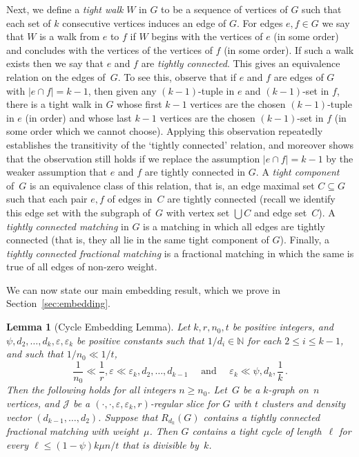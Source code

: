 \documentclass[12pt,a4paper]{amsart}
\let\subset\subseteq
\let\eps\varepsilon
\newtheorem{lemma}[theorem] {Lemma}
\newcommand{\NATS}{\mathbb{N}}
\newcommand{\cJ}{\mathcal{J}}
\begin{document}
  Next, we define a \emph{tight walk} $W$ in $G$ to be a sequence of vertices of $G$ such that each set of $k$ consecutive vertices induces an edge of $G$.
For edges $e, f \in G$ we say that $W$ is a walk from $e$ to $f$ if $W$ begins with 
the vertices of $e$ (in some order) and concludes with the vertices of  
the vertices of $f$ (in some order). If such a walk exists then we say that $e$ and $f$ are 
\emph{tightly connected}. This gives an equivalence relation on the
edges of~$G$. To see this, observe that if $e$ and $f$ are edges of $G$ with 
$|e \cap f| = k-1$, then given any $(k-1)$-tuple in $e$ and
 $(k-1)$-set in $f$, there is a tight walk in $G$ whose first $k-1$ vertices are
 the chosen $(k-1)$-tuple in $e$ (in order) and whose last $k-1$ vertices are
 the chosen $(k-1)$-set in $f$ (in some order which we cannot choose). Applying this observation repeatedly establishes the transitivity of the `tightly connected' relation, and moreover shows that the observation still holds if we replace the assumption $|e \cap f| = k-1$ by the weaker assumption that $e$ and $f$ are tightly connected in $G$. 
A \emph{tight component} of~$G$ is an equivalence class of this relation, that is, an edge maximal set
$C \subset G$ such that each pair $e, f$ of edges in~$C$ are tightly
connected (recall we identify this edge set with the subgraph of~$G$ with vertex set $\bigcup C$ and edge set~$C$). A \emph{tightly connected matching} in $G$ is a matching in which all edges are tightly connected (that is, they all lie in the same tight component of $G$). Finally, a \emph{tightly connected fractional matching} is a fractional matching in which the same is true of all edges of non-zero weight.

We can now state our main embedding result, which we prove in Section~\ref{sec:embedding}.

\begin{lemma}[Cycle Embedding Lemma]\label{lem:emb}
  Let $k,r,n_0,t$ be positive integers, and $\psi,d_2,\ldots,d_k,\eps,\eps_k$ be
  positive constants such that $1/d_i\in\NATS$ for each $2\le i\le k-1$, and such
  that $1/n_0 \ll 1/t$,
\[\frac{1}{n_0} \ll
  \frac{1}{r},\eps\ll\eps_k,d_2,\ldots,d_{k-1}\quad\text{ and }\quad\eps_k\ll
  \psi,d_k,\frac{1}{k}\,.\] Then the following holds for all integers $n\ge
  n_0$. Let~$G$ be a $k$-graph on~$n$ vertices, and $\cJ$ be a $(\cdot,\cdot,\eps,\eps_k,r)$-regular slice for $G$ with $t$ clusters and density vector $(d_{k-1},\ldots,d_{2})$. Suppose that
  $R_{d_k}(G)$ contains a tightly connected fractional matching with weight~$\mu$. Then $G$ contains a tight cycle of length~$\ell$ for every
      $ \ell\le(1-\psi)k\mu n/t$ that is divisible by~$k$.
\end{lemma}
 
\end{document}
